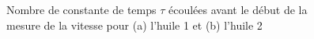 \begin{figure}[H]
\begin{subfigure}{0.48\linewidth}
        \caption{}
        \label{fig:huile2_tau}
    \end{subfigure}
    \caption{Nombre de constante de temps $\tau$ écoulées avant le début de la mesure de la vitesse pour (a) l'huile 1 et (b) l'huile 2}
\end{figure}

